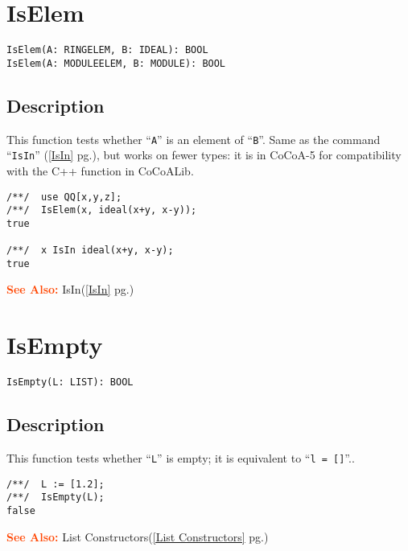 \documentclass[a4paper]{mybook}
\newenvironment{command}{}{} %
\newcommand\SeeAlso{\par\textcolor{OrangeRed}{\textbf{\large See Also: }}}
\begin{document}
\section{IsElem}
\label{IsElem}
\begin{command} %


\begin{Verbatim}[label=syntax, rulecolor=\color{MidnightBlue},
frame=single]
IsElem(A: RINGELEM, B: IDEAL): BOOL
IsElem(A: MODULEELEM, B: MODULE): BOOL
\end{Verbatim}


\subsection*{Description}

This function tests whether ``\verb&A&'' is an element of ``\verb&B&''.
Same as the command ``\verb&IsIn&'' (\ref{IsIn} pg.\pageref{IsIn}), but works on fewer types: it
is in CoCoA-5 for compatibility with the C++ function in CoCoALib.
\begin{Verbatim}[label=example, rulecolor=\color{PineGreen}, frame=single]
/**/  use QQ[x,y,z];
/**/  IsElem(x, ideal(x+y, x-y));
true

/**/  x IsIn ideal(x+y, x-y);
true
\end{Verbatim}


\SeeAlso %
  IsIn(\ref{IsIn} pg.\pageref{IsIn})
\end{command} %

\section{IsEmpty}
\label{IsEmpty}
\begin{command} %


\begin{Verbatim}[label=syntax, rulecolor=\color{MidnightBlue},
frame=single]
IsEmpty(L: LIST): BOOL
\end{Verbatim}


\subsection*{Description}

This function tests whether ``\verb&L&'' is empty; it is equivalent to ``\verb&l = []&''..
\begin{Verbatim}[label=example, rulecolor=\color{PineGreen}, frame=single]
/**/  L := [1.2];
/**/  IsEmpty(L);
false
\end{Verbatim}


\SeeAlso %
  List Constructors(\ref{List Constructors} pg.\pageref{List Constructors})
\end{command} %
\end{document}
